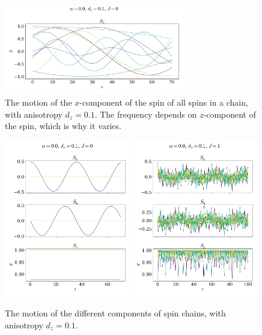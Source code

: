 \documentclass{article}
\begin{document}
    \begin{figure}[H]
        \centering
        \includegraphics[width=0.7\textwidth]{../plots/2221a.pdf}
        \caption{The motion of the $x$-component of the spin of all spins in a chain, with anisotropy $d_z=0.1$. The frequency depends on $z$-component of the spin, which is why it varies.}
        \label{all tilted}
    \end{figure}


    \begin{figure}[H]
        \centering
        \includegraphics[width=0.49\textwidth]{../plots/2221b.pdf}
        \includegraphics[width=0.49\textwidth]{../plots/2222.pdf}
        \caption{The motion of the different components of spin chains, with anisotropy $d_z=0.1$.}
        \label{one tilted}
    \end{figure}
\end{document}

